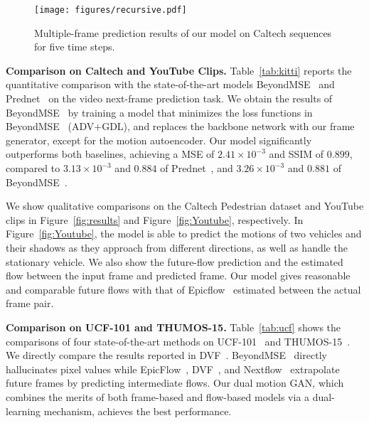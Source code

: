 \documentclass[10pt,twocolumn,letterpaper]{article}
\begin{document}
	\begin{figure*}[!tp]
		\begin{center}
			\texttt{[image: figures/recursive.pdf]}
			\caption{Multiple-frame prediction results of our model on Caltech sequences for five time steps.} 
			\label{fig:recursive}
		\end{center}
		\vspace{-7mm}
	\end{figure*}
	
	\textbf{Comparison on Caltech and YouTube Clips.} Table~\ref{tab:kitti} reports the quantitative comparison with the state-of-the-art models  BeyondMSE~\cite{mathieu2015deep} and Prednet~\cite{lotter2016deep} on the video next-frame prediction task. We obtain the results of BeyondMSE~\cite{mathieu2015deep} by training a model that minimizes the loss functions in BeyondMSE~\cite{mathieu2015deep} (ADV+GDL), and replaces the backbone network with our frame generator, except for the motion autoencoder. Our model significantly outperforms both baselines, achieving a MSE of $2.41\times10^{−3}$ and SSIM of $0.899$, compared to $3.13\times10^{−3}$ and $0.884$ of Prednet~\cite{lotter2016deep}, and $3.26\times10^{−3}$ and $0.881$ of BeyondMSE~\cite{mathieu2015deep}.
	
	We show qualitative comparisons on the Caltech Pedestrian dataset and YouTube clips in Figure~\ref{fig:results} and Figure~\ref{fig:Youtube}, respectively. In Figure~\ref{fig:Youtube}, the model is able to predict the motions of two vehicles and their shadows as they approach from different directions, as well as handle the stationary vehicle. We also show the future-flow prediction and the estimated flow between the input frame and predicted frame. Our model gives reasonable and comparable future flows with that of Epicflow~\cite{revaud2015epicflow} estimated between the actual frame pair. %
	
	\textbf{Comparison on UCF-101 and THUMOS-15.}
	Table~\ref{tab:ucf} shows the comparisons of four state-of-the-art methods on UCF-101~\cite{soomro2012ucf101} and THUMOS-15~\cite{gorban2015thumos}. We directly compare the results reported in DVF~\cite{liu2017video}. BeyondMSE~\cite{mathieu2015deep} directly hallucinates pixel values while EpicFlow~\cite{revaud2015epicflow}, DVF~\cite{liu2017video}, and Nextflow~\cite{sedaghat2016next} extrapolate future frames by predicting intermediate flows. Our dual motion GAN, which combines the merits of both frame-based and flow-based models via a dual-learning mechanism, achieves the best performance.
	
\end{document}
